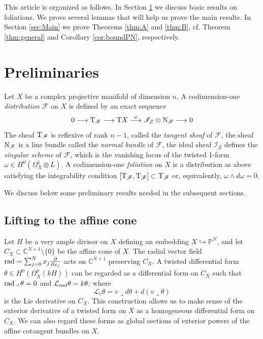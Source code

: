 \documentclass[a4paper, 11pt]{amsart}
\newcommand{\CC}{\mathbb{C}}
\theoremstyle{plain}
\numberwithin{theorem}{section}
\theoremstyle{definition}
\newcommand{\PP}{\mathbb{P}}
\DeclareMathOperator{\cont}{\lrcorner}
\newcommand{\into}{\hookrightarrow}
\newcommand{\lra}{\longrightarrow}
\newcommand{\sF}{\mathscr{F}}
\newcommand{\sI}{\mathscr{I}}
\newcommand{\tF}{{\rm T}_\mathscr{F}}
\newcommand{\nF}{{\rm N}_\mathscr{F}}
\newcommand{\tX}{{\rm T}X}
\newcommand{\del}[1]{{\frac{\partial}{\partial x_{#1}}}}
\newcommand{\lder}{\mathcal{L}}
\newcommand{\rad}{ {\rm rad}}
\begin{document}
This article is organized as follows. In Section \ref{sec:Prelim} we discuss basic results on foliations. We prove several lemmas that will help us prove the main results. In Section \ref{sec:Main} we prove Theorems \ref{thm:A} and \ref{thm:B}, cf. Theorem \ref{thm:general} and Corollary \ref{cor:boundPN}, respectively. 



\section{Preliminaries} \label{sec:Prelim}
Let $X$ be a complex projective manifold of dimension $n$. A codimension-one \emph{distribution} $\sF$ on $X$ is defined by an exact sequence
\[
0 \lra \tF \lra \tX \stackrel{\omega}{\lra} \sI_Z\otimes \nF \lra 0
\]
The sheaf $\tF$ is reflexive of rank $n-1$, called the \emph{tangent sheaf} of $\sF$, the sheaf $\nF$ is a line bundle called the \emph{normal bundle} of $\sF$, the ideal sheaf $\sI_Z$ defines the \emph{singular scheme} of $\sF$, which is the vanishing locus of the twisted 1-form $\omega \in H^0(\Omega_X^1\otimes L)$. A codimension-one \emph{foliation} on $X$ is a distribution as above satisfying the integrability condition $[\tF,\tF] \subset \tF$ or, equivalently, $\omega \wedge d\omega = 0$. 

We discuss below some preliminary results needed in the subsequent sections. 

\subsection{Lifting to the affine cone} 
Let $H$ be a very ample divisor on $X$ defining an embedding $X\into \PP^N$, and let $C_X \subset \CC^{N+1}\setminus \{0\}$ be the affine cone of $X$. The radial vector field $\rad = \sum_{j=0}^{N} x_j \del{j}$ acts on $\CC^{N+1}$ preserving $C_X$. A twisted differential form $\theta \in H^0(\Omega_X^p(kH))$ can be regarded as a differential form on $C_X$  such that $\rad \cont \theta=0$ and $\lder_\rad \theta = k\theta$; where
\[
\lder_v\theta = v\cont d\theta + d(v\cont \theta)
\]
is the Lie derivative on $C_X$. This construction allows us to make sense of the exterior derivative of a twisted form on $X$ as a homogeneous differential form on $C_X$. We can also regard these forms as global sections of exterior powers of the affine cotangent bundles on $X$. 
\end{document}
